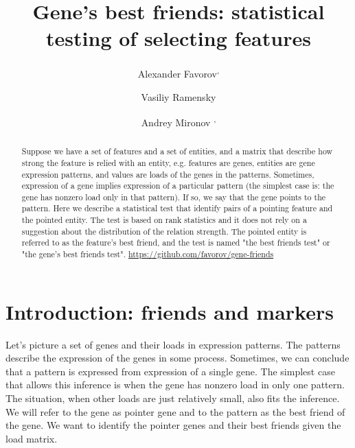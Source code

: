 \documentclass{llncs}
\begin{document}
%
\title{Gene's best friends: statistical testing of selecting features}
%
%
\author{Alexander Favorov\textsuperscript, \and Vasiliy Ramensky 
\and Andrey Mironov \textsuperscript,}
%
%
%

\maketitle              %

\begin{abstract}
Suppose we have a set of features and a set of entities, and a matrix that describe how strong the feature is relied with an entity, e.g. features are genes, entities are gene expression patterns, and values are loads of the genes in the patterns. Sometimes, expression of a gene implies expression of a particular pattern (the simplest case is: the gene has nonzero load only in that pattern). If so, we say that the gene points to the pattern. Here we describe a statistical test that identify pairs of a pointing feature and the pointed entity. The test is based on rank statistics and it does not rely on a suggestion about the distribution of the relation strength. The pointed entity is referred to as the feature's best friend, and the test is named "the best friends test" or "the gene's best friends test". \url{https://github.com/favorov/gene-friends}
\end{abstract}
%
\section{Introduction: friends and markers}
Let's picture a set of genes and their loads in expression patterns. The patterns describe the expression of the genes in some process. Sometimes, we can conclude that a pattern is expressed from expression of a single gene. The simplest case that allows this inference is when the gene has nonzero load in only one pattern. The situation, when other loads are just relatively small, also fits the inference. We will refer to the gene as pointer gene and to the pattern as the best friend of the gene. We want to identify the pointer genes and their best friends given the load matrix.
\end{document}
